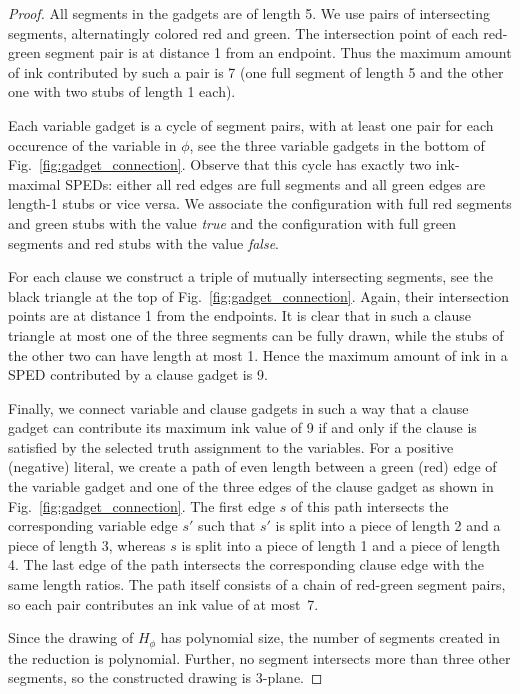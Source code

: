 \documentclass[a4paper,english,numberwithinsect]{eurocg18}
\begin{document}
\begin{proof}
	All segments in the gadgets are of length 5.
	We use pairs of intersecting segments, alternatingly colored red and green.
	The intersection point of each red-green segment pair is at distance 1 from an endpoint.
	Thus the maximum amount of ink contributed by such a pair is 7 (one full segment of length 5 and the other one with two stubs of length 1 each).
	
	Each variable gadget is a cycle of segment pairs, with at least one pair for each occurence of the variable in $\phi$, see the three variable gadgets in the bottom of Fig.~\ref{fig:gadget_connection}. 
	Observe that this cycle has exactly two ink-maximal SPEDs: either all red edges are full segments and all green edges are length-1 stubs or vice versa.
	We associate the configuration with full red segments and green stubs with the value \emph{true} and the configuration with full green segments and red stubs with the value \emph{false}.
	
	For each clause we construct a triple of mutually intersecting segments, see the black triangle at the top of Fig.~\ref{fig:gadget_connection}.
	Again, their intersection points are at distance 1 from the endpoints.
	It is clear that in such a clause triangle at most one of the three segments can be fully drawn, while the stubs of the other two can have length at most 1.
	Hence the maximum amount of ink in a SPED contributed by a clause gadget is 9.
	
	Finally, we connect variable and clause gadgets in such a way that a clause gadget can contribute its maximum ink value of 9 if and only if the clause is satisfied by the selected truth assignment to the variables.
	For a positive (negative) literal, we create a path of even length between a green (red) edge of the variable gadget and one of the three edges of the clause gadget as shown in Fig.~\ref{fig:gadget_connection}.
	The first edge $s$ of this path intersects the corresponding variable edge $s'$ such that $s'$ is split into a piece of length 2 and a piece of length 3, whereas $s$ is split into a piece of length 1 and a piece of length 4.
	The last edge of the path intersects the corresponding clause edge with the same length ratios.
	The path itself consists of a chain of red-green segment pairs, so each pair contributes an ink value of at most~7.
	
	Since the drawing of $H_\phi$ has polynomial size, the number of segments created in the reduction is polynomial. 
	Further, no segment intersects more than three other segments, so the constructed drawing is 3-plane. 


\end{proof}
\end{document}
